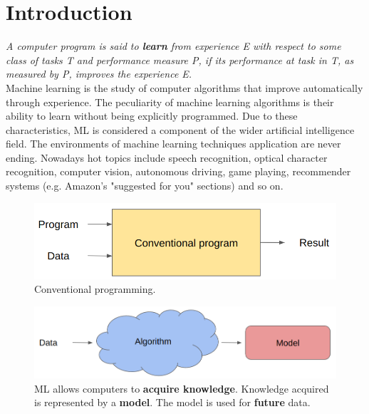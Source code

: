 \chapter{Introduction}
\label{cha:intro}

\textit{A computer program is said to \textbf{learn} from experience E with respect to some class of tasks T and performance measure P, if its performance at task in T, as measured by P, improves the experience E.}\\

Machine learning is the study of computer algorithms that improve automatically through experience. The peculiarity of machine learning algorithms is their ability to learn without being explicitly programmed. Due to these characteristics, ML is considered a component of the wider artificial intelligence field.
The environments of machine learning techniques application are never ending. Nowadays hot topics include speech recognition, optical character recognition, computer vision, autonomous driving, game playing, recommender systems (e.g. Amazon's "suggested for you" sections) and so on.

\begin{figure}
    \centering
    \includegraphics[width=\textwidth]{images/conventionalProgram.png}
    \caption{Conventional programming.}
    \label{fig:conventionalProgramming}
\end{figure}

\begin{figure}
    \centering
    \includegraphics[width=\textwidth]{images/MachineLearningvsConventional.png}
    \caption{ML allows computers to \textbf{acquire knowledge}. Knowledge acquired is represented by a \textbf{model}. The model is used for \textbf{future} data.}
    \label{fig:mlvsconventionalProgramming}
\end{figure}

